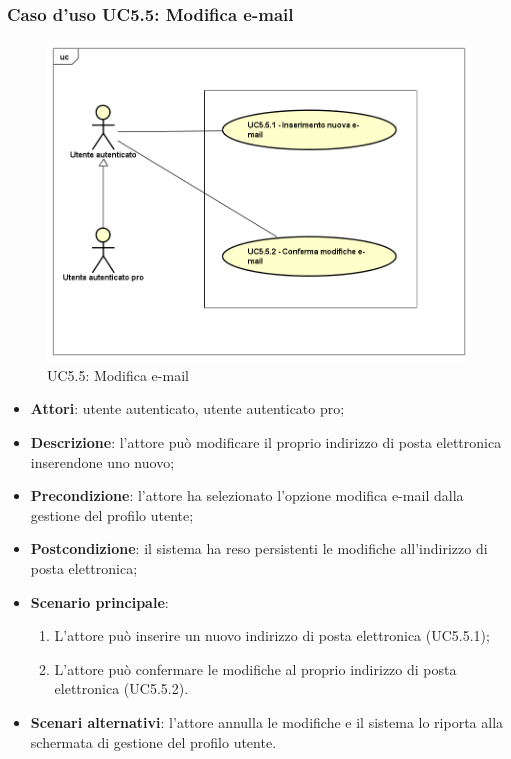 \subsubsection{Caso d'uso UC5.5: Modifica e-mail}
\label{UC5.5}
\begin{figure}[h]
	\centering
	\includegraphics[scale=0.5,keepaspectratio]{UML/UC5_5.png}
	\caption{UC5.5: Modifica e-mail}
\end{figure}

\begin{itemize}
	\item \textbf{Attori}: utente autenticato, utente autenticato pro;
	\item \textbf{Descrizione}: l'attore può modificare il proprio indirizzo di posta elettronica inserendone uno nuovo;
	\item \textbf{Precondizione}:  l'attore ha selezionato l'opzione modifica e-mail dalla gestione del profilo utente; 
	\item \textbf{Postcondizione}: il sistema ha reso persistenti le modifiche all'indirizzo di posta elettronica;
	\item \textbf{Scenario principale}:
		\begin{enumerate}
			\item L'attore può inserire un nuovo indirizzo di posta elettronica (UC5.5.1);
			\item L'attore può confermare le modifiche al proprio indirizzo di posta elettronica (UC5.5.2).
		\end{enumerate}
	\item \textbf{Scenari alternativi}: l'attore annulla le modifiche e il sistema lo riporta alla schermata di gestione del profilo utente.
\end{itemize}


